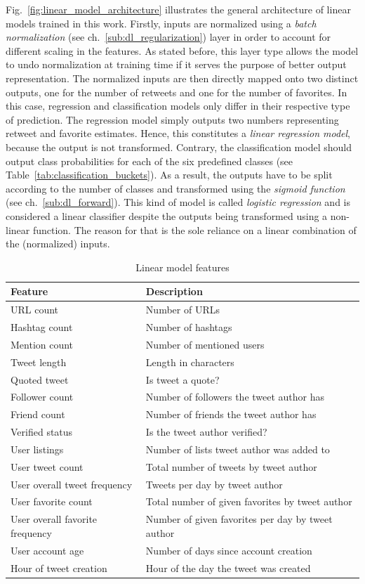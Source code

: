 Fig.~\ref{fig:linear_model_architecture} illustrates the general architecture
of linear models trained in this work.
Firstly, inputs are normalized using a \textit{batch normalization} (see ch.~\ref{sub:dl_regularization})
layer in order to account for different scaling in the features.
As stated before, this layer type allows the model to undo normalization at
training time if it serves the purpose of better output representation.
The normalized inputs are then directly mapped onto two distinct outputs,
one for the number of retweets and one for the number of favorites.
In this case, regression and classification models only differ in their
respective type of prediction.
The regression model simply outputs two numbers representing retweet and
favorite estimates.
Hence, this constitutes a \textit{linear regression model}, because the output is not transformed.
Contrary, the classification model should output class probabilities for each
of the six predefined classes (see Table~\ref{tab:classification_buckets}).
As a result, the outputs have to be split according to the number of classes and transformed
using the \textit{sigmoid function} (see ch.~\ref{sub:dl_forward}).
This kind of model is called \textit{logistic regression} and is considered
a linear classifier despite the outputs being transformed using a non-linear
function.
The reason for that is the sole reliance on a linear combination of the
(normalized) inputs.

\begin{table}
\centering
\begin{tabular}{ll}
\toprule
Feature & Description \\
\midrule
URL count & Number of URLs \\
Hashtag count & Number of hashtags \\
Mention count & Number of mentioned users \\
Tweet length & Length in characters \\
Quoted tweet & Is tweet a quote? \\
\midrule
Follower count & Number of followers the tweet author has \\
Friend count & Number of friends the tweet author has \\
Verified status & Is the tweet author verified? \\
User listings & Number of lists tweet author was added to \\
User tweet count & Total number of tweets by tweet author \\
User overall tweet frequency & Tweets per day by tweet author \\
User favorite count & Total number of given favorites by tweet author \\
User overall favorite frequency & Number of given favorites per day by tweet author \\
User account age & Number of days since account creation \\
Hour of tweet creation & Hour of the day the tweet was created \\
\bottomrule
\end{tabular}
\caption{Linear model features}
\label{tab:structured_features}
\end{table}

